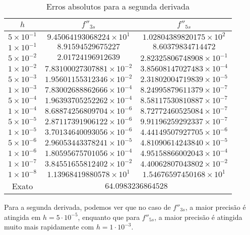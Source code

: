 \documentclass[12pt,a4paper]{article}
\begin{document}
\begin{table}[H]
\centering
\begin{tabular}{|c|c|c|}
\hline
$h$ & $f''_{3s}$ & $f''_{5s}$ \\ \hline
$5 \times 10^{-1}$ & $9.45064193068224 \times 10^{1}$ & $1.02804389820175 \times 10^{2}$ \\ \hline
$1 \times 10^{-1}$ & $8.91594529675227$ & $8.60379834714472$ \\ \hline
$5 \times 10^{-2}$ & $2.01724196912639$ & $2.82325806748908 \times 10^{-1}$ \\ \hline
$1 \times 10^{-2}$ & $7.83100027307881 \times 10^{-2}$ & $3.85608147027483 \times 10^{-4}$ \\ \hline
$5 \times 10^{-3}$ & $1.95601155312346 \times 10^{-2}$ & $2.31802004719839 \times 10^{-5}$ \\ \hline
$1 \times 10^{-3}$ & $7.83002688862666 \times 10^{-4}$ & $8.24995879611379 \times 10^{-7}$ \\ \hline
$5 \times 10^{-4}$ & $1.96393705252262 \times 10^{-4}$ & $8.58117530810887 \times 10^{-7}$ \\ \hline
$1 \times 10^{-4}$ & $8.68874256809704 \times 10^{-6}$ & $8.72772460525084 \times 10^{-7}$ \\ \hline
$5 \times 10^{-5}$ & $2.87117391906122 \times 10^{-6}$ & $9.91196259292337 \times 10^{-7}$ \\ \hline
$1 \times 10^{-5}$ & $3.70134640093056 \times 10^{-6}$ & $4.44149507927705 \times 10^{-6}$ \\ \hline
$5 \times 10^{-6}$ & $2.96053443378241 \times 10^{-5}$ & $4.81090614243840 \times 10^{-5}$ \\ \hline
$1 \times 10^{-6}$ & $1.80595675701056 \times 10^{-4}$ & $4.95158866002043 \times 10^{-4}$ \\ \hline
$1 \times 10^{-7}$ & $3.84551655812402 \times 10^{-2}$ & $4.40062807043802 \times 10^{-2}$ \\ \hline
$1 \times 10^{-8}$ & $1.13968419880578 \times 10^{1}$ & $1.54676597450168 \times 10^{1}$ \\ \hline
Exato & \multicolumn{2}{c|}{$64.0983236864528$} \\ \hline
\end{tabular}
\caption{Erros absolutos para a segunda derivada}
\end{table}

Para a segunda derivada, podemos ver que no caso de $f''_{3s}$, a maior precisão é atingida em $h = 5\cdot 10^{-5}$, enquanto que para $f''_{5s}$, a maior precisão é atingida muito mais rapidamente com $h = 1\cdot10^{-3}$.
\end{document}
